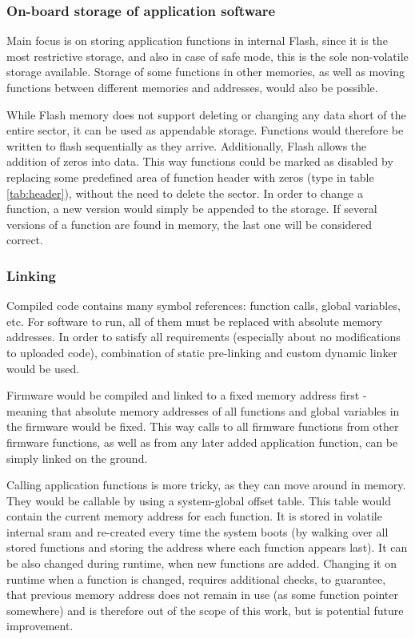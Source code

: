 \subsubsection{On-board storage of application software}

Main focus is on storing application functions in internal Flash, since it is the most restrictive storage, and also in case of safe mode, this is the sole non-volatile storage available. Storage of some functions in other memories, as well as moving functions between different memories and addresses, would also be possible.

While Flash memory does not support deleting or changing any data short of the entire sector, it can be used as appendable storage. Functions would therefore be written to flash sequentially as they arrive. Additionally, Flash allows the addition of zeros into data. This way functions could be marked as disabled by replacing some predefined area of function header with zeros (type in table \ref{tab:header}), without the need to delete the sector. In order to change a function, a new version would simply be appended to the storage. If several versions of a function are found in memory, the last one will be considered correct.

\subsubsection{Linking}

Compiled code contains many symbol references: function calls, global variables, etc. For software to run, all of them must be replaced with absolute memory addresses. In order to satisfy all requirements (especially about no modifications to uploaded code), combination of static pre-linking and custom dynamic linker would be used.

Firmware would be compiled and linked to a fixed memory address first - meaning that absolute memory addresses of all functions and global variables in the firmware would be fixed. This way calls to all firmware functions from other firmware functions, as well as from any later added application function, can be simply linked on the ground.

Calling application functions is more tricky, as they can move around in memory. They would be callable by using a system-global offset table. This table would contain the current memory address for each function. It is stored in volatile internal \gls{sram} and re-created every time the system boots (by walking over all stored functions and storing the address where each function appears last). It can be also changed during runtime, when new functions are added. Changing it on runtime when a function is changed, requires additional checks, to guarantee, that previous memory address does not remain in use (as some function pointer somewhere) and is therefore out of the scope of this work, but is potential future improvement.

